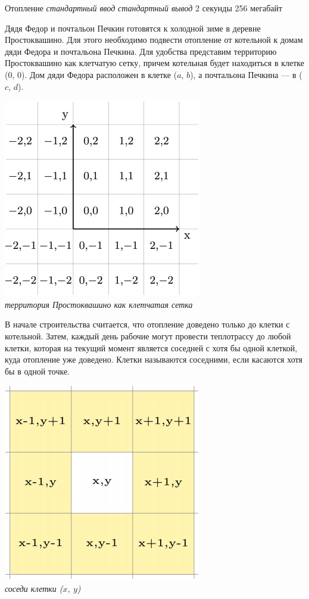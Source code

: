 \begin{problem}%
{Отопление}%
{\textsl{стандартный ввод}}%
{\textsl{стандартный вывод}}%
{2 секунды}%
{256 мегабайт}{}

Дядя Федор и почтальон Печкин готовятся к холодной зиме в деревне Простоквашино. Для этого необходимо подвести отопление от котельной к домам дяди Федора и почтальона Печкина. Для удобства представим территорию Простоквашино как клетчатую сетку, причем котельная будет находиться в клетке ($0$, $0$). Дом дяди Федора расположен в клетке ($a$, $b$), а почтальона Печкина — в ($c$, $d$).

\begin{center}
\includegraphics[scale=0.5]{images/1.png}\\
\textit{территория Простоквашино как клетчатая сетка}
\end{center}

В начале строительства считается, что отопление доведено только до клетки с котельной. Затем, каждый день рабочие могут провести теплотрассу до любой клетки, которая на текущий момент является соседней с хотя бы одной клеткой, куда отопление уже доведено. Клетки называются соседними, если касаются хотя бы в одной точке.

\begin{center}
\includegraphics[scale=0.5]{images/2.png}\\
\textit{соседи клетки ($x$, $y$)}
\end{center}


\end{problem}

